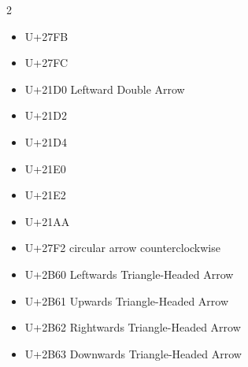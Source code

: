 \begin{multicols}{2}
\begin{itemize}
    \item U+27FB %
    \item U+27FC %
    \item U+21D0 Leftward Double Arrow %
    \item U+21D2 %
    \item U+21D4 %
    \item U+21E0 %
    \item U+21E2 %
    \item U+21AA %
    \item U+27F2 circular arrow counterclockwise %
    \item U+2B60 Leftwards Triangle-Headed Arrow %
    \item U+2B61 Upwards Triangle-Headed Arrow %
    \item U+2B62 Rightwards Triangle-Headed Arrow %
    \item U+2B63 Downwards Triangle-Headed Arrow %
\end{itemize}
\end{multicols}
